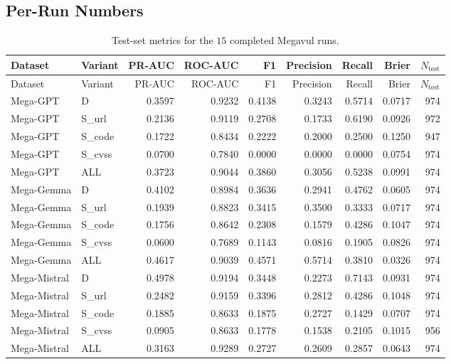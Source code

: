 \documentclass[11pt]{article}
\begin{document}
\subsection{Per-Run Numbers}

\small
\begin{longtable}{llrrrrrrr}
\caption{Test-set metrics for the $15$ completed Megavul runs.}\\
\toprule
Dataset & Variant & PR-AUC & ROC-AUC & F1 & Precision & Recall & Brier & $N_{\text{test}}$ \\
\midrule
\endfirsthead
\toprule
Dataset & Variant & PR-AUC & ROC-AUC & F1 & Precision & Recall & Brier & $N_{\text{test}}$ \\
\midrule
\endhead
\bottomrule
\endfoot

Mega-GPT     & D       & 0.3597 & 0.9232 & 0.4138 & 0.3243 & 0.5714 & 0.0717 & 974 \\
Mega-GPT     & S\_url  & 0.2136 & 0.9119 & 0.2708 & 0.1733 & 0.6190 & 0.0926 & 972 \\
Mega-GPT     & S\_code & 0.1722 & 0.8434 & 0.2222 & 0.2000 & 0.2500 & 0.1250 & 947 \\
Mega-GPT     & S\_cvss & 0.0700 & 0.7840 & 0.0000 & 0.0000 & 0.0000 & 0.0754 & 974 \\
Mega-GPT     & ALL     & 0.3723 & 0.9044 & 0.3860 & 0.3056 & 0.5238 & 0.0991 & 974 \\

Mega-Gemma   & D       & 0.4102 & 0.8984 & 0.3636 & 0.2941 & 0.4762 & 0.0605 & 974 \\
Mega-Gemma   & S\_url  & 0.1939 & 0.8823 & 0.3415 & 0.3500 & 0.3333 & 0.0717 & 974 \\
Mega-Gemma   & S\_code & 0.1756 & 0.8642 & 0.2308 & 0.1579 & 0.4286 & 0.1047 & 974 \\
Mega-Gemma   & S\_cvss & 0.0600 & 0.7689 & 0.1143 & 0.0816 & 0.1905 & 0.0826 & 974 \\
Mega-Gemma   & ALL     & 0.4617 & 0.9039 & 0.4571 & 0.5714 & 0.3810 & 0.0326 & 974 \\

Mega-Mistral & D       & 0.4978 & 0.9194 & 0.3448 & 0.2273 & 0.7143 & 0.0931 & 974 \\
Mega-Mistral & S\_url  & 0.2482 & 0.9159 & 0.3396 & 0.2812 & 0.4286 & 0.1048 & 974 \\
Mega-Mistral & S\_code & 0.1885 & 0.8633 & 0.1875 & 0.2727 & 0.1429 & 0.0707 & 974 \\
Mega-Mistral & S\_cvss & 0.0905 & 0.8633 & 0.1778 & 0.1538 & 0.2105 & 0.1015 & 956 \\
Mega-Mistral & ALL     & 0.3163 & 0.9289 & 0.2727 & 0.2609 & 0.2857 & 0.0643 & 974 \\

\end{longtable}
\normalsize
\end{document}
